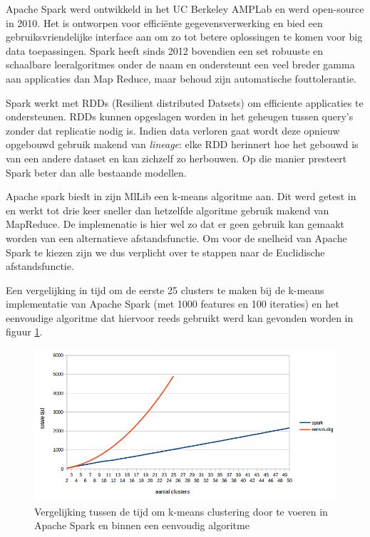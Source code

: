 Apache Spark werd ontwikkeld in het UC Berkeley AMPLab en werd open-source in 2010. Het is ontworpen voor effici\"ente gegevensverwerking en bied een gebruiksvriendelijke interface aan om zo tot betere oplossingen te komen voor big data toepassingen. Spark heeft sinds 2012 bovendien een set robuuste en schaalbare leeralgoritmes onder de naam  en ondersteunt een veel breder gamma aan applicaties dan Map Reduce, maar behoud zijn automatische fouttolerantie.
 
Spark werkt met RDDs (Resilient distributed Datsets) om efficiente applicaties te ondersteunen. RDDs kunnen opgeslagen worden in het geheugen tussen query's zonder dat replicatie nodig is. Indien data verloren gaat wordt deze opnieuw opgebouwd gebruik makend van \textit{lineage}: elke RDD herinnert hoe het gebouwd is van een andere dataset en kan zichzelf zo herbouwen. Op die manier presteert Spark beter dan alle bestaande modellen.

Apache spark biedt in zijn MlLib een k-means algoritme aan. Dit werd getest in \cite{Gopalani2015a} en werkt tot drie keer sneller dan hetzelfde algoritme gebruik makend van MapReduce. De implemenatie is hier wel zo dat er geen gebruik kan gemaakt worden van een alternatieve afstandsfunctie. Om voor de snelheid van Apache Spark te kiezen zijn we dus verplicht over te stappen naar de Euclidische afstandsfunctie.

Een vergelijking in tijd om de eerste 25 clusters te maken bij de k-means implementatie van Apache Spark (met 1000 features en 100 iteraties) en het eenvoudige algoritme dat hiervoor reeds gebruikt werd kan gevonden worden in figuur \ref{fig:sparkvskmeans}. 

\begin{figure}[h]
	\caption{Vergelijking tussen de tijd om k-means clustering door te voeren in Apache Spark en binnen een eenvoudig algoritme}
	\label{fig:sparkvskmeans}	
	\includegraphics[width=\textwidth]{fig/sparkvsclustering.png}
\end{figure}

